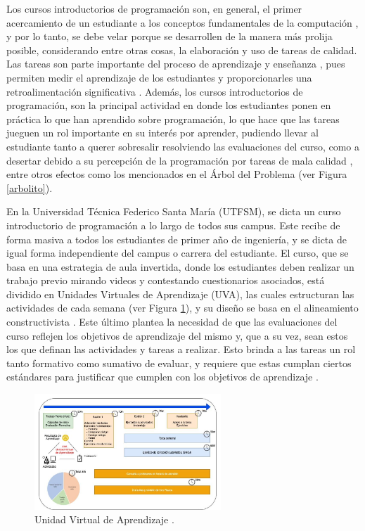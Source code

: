 \documentclass[letterpaper,12pt]{article}
\begin{document}
Los cursos introductorios de programación son, en general, el primer acercamiento de un estudiante a los conceptos fundamentales de la computación \cite{10.7717/peerj-cs.647}, y por lo tanto, se debe velar porque se desarrollen de la manera más prolija posible, considerando entre otras cosas, la elaboración y uso de tareas de calidad. Las tareas son parte importante del proceso de aprendizaje y enseñanza \cite{texasU}, pues permiten medir el aprendizaje de los estudiantes y proporcionarles una retroalimentación significativa \cite{NAP12636}. Además, los cursos introductorios de programación, son la principal actividad en donde los estudiantes ponen en práctica lo que han aprendido sobre programación, lo que hace que las tareas jueguen un rol importante en su interés por aprender, pudiendo llevar al estudiante tanto a querer sobresalir resolviendo las evaluaciones del curso, como a desertar debido a su percepción de la programación por tareas de mala calidad \cite{10.5555/1968521.1968545, 10.1145/2526968.2526982}, entre otros efectos como los mencionados en el Árbol del Problema (ver Figura \ref{arbolito}).

En la Universidad Técnica Federico Santa María (UTFSM), se dicta un curso introductorio de programación a lo largo de todos sus campus. Este recibe de forma masiva a todos los estudiantes de primer año de ingeniería, y se dicta de igual forma independiente del campus o carrera del estudiante. El curso, que se basa en una estrategia de aula invertida\cite{tucker2012flipped}, donde los estudiantes deben realizar un trabajo previo mirando videos y contestando cuestionarios asociados, está dividido en Unidades Virtuales de Aprendizaje (UVA), las cuales estructuran las actividades de cada semana (ver Figura \ref{modeloiwi}), y su diseño se basa en el alineamiento constructivista \cite{book}. Este último plantea la necesidad de que las evaluaciones del curso reflejen los objetivos de aprendizaje del mismo y, que a su vez, sean estos los que definan las actividades y tareas a realizar. Esto brinda a las tareas un rol tanto formativo como sumativo de evaluar, y requiere que estas cumplan ciertos estándares para justificar que cumplen con los objetivos de aprendizaje \cite{book}.

\begin{figure}[H]
  \centering
  \includegraphics[width=0.625\textwidth]{uva.png}
  \caption{Unidad Virtual de Aprendizaje \cite{9640145}.}
  \label{modeloiwi}
\end{figure}
\end{document}
